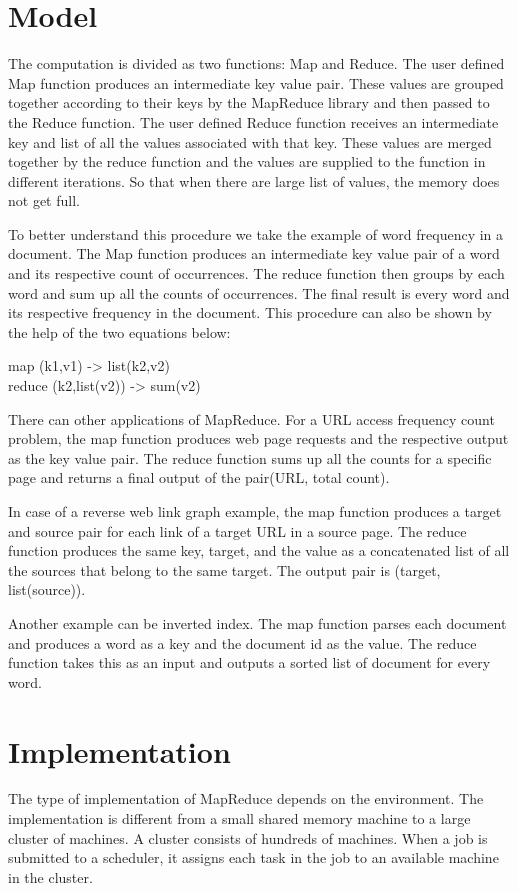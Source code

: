 \documentclass[sigconf]{acmart}
\begin{document}
\section{Model}
\par The computation is divided as two functions: Map and Reduce. The user defined Map function produces an intermediate key value pair. These values are grouped together according to their keys by the MapReduce library and then passed to the Reduce function. The user defined Reduce function receives an intermediate key and list of all the values associated with that key. These values are merged together by the reduce function and the values are supplied to the function in different iterations. So that when there are large list of values, the memory does not get full. 
\par To better understand this procedure we take the example of word frequency in a document. The Map function produces an intermediate key value pair of a word and its respective count of occurrences. The reduce function then groups by each word and sum up all the counts of occurrences. The final result is every word and its respective frequency in the document.  This procedure can also be shown by the help of the two equations below:
\begin{center}
map    (k1,v1) ->  list(k2,v2)\\
reduce (k2,list(v2)) -> sum(v2)
\end{center} 
\par There can other applications of MapReduce. For a URL access frequency count problem, the map function produces web page requests and the respective output as the key value pair. The reduce function sums up all the counts for a specific page and returns a final output of the pair(URL, total count). 
\par In case of a reverse web link graph example, the map function produces a target and source pair for each link of a target URL in a source page. The reduce function produces the same key, target, and the value as a concatenated list of all the sources that belong to the same target. The output pair is (target, list(source)).
\par Another example can be inverted index. The map function parses each document and produces a word as a key and the document id as the value.  The reduce function takes this as an input and outputs a sorted list of document for every word. 
\section{Implementation}
\par The type of implementation of MapReduce depends on the environment. The implementation is different from a small shared memory machine to a large cluster of machines.  A cluster consists of hundreds of machines. When a job is submitted to a scheduler, it assigns each task in the job to an available machine in the cluster.
\end{document}
